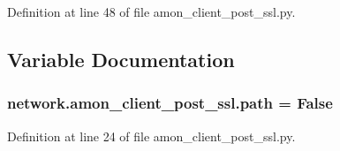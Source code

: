 Definition at line 48 of file amon\-\_\-client\-\_\-post\-\_\-ssl.\-py.



\subsection{Variable Documentation}
\hypertarget{namespacenetwork_1_1amon__client__post__ssl_a76288cc1048af423223bda2fbe4de79a}{
\subsubsection[{path}]{\setlength{\rightskip}{0pt plus 5cm}network.\-amon\-\_\-client\-\_\-post\-\_\-ssl.\-path = False}}\label{namespacenetwork_1_1amon__client__post__ssl_a76288cc1048af423223bda2fbe4de79a}


Definition at line 24 of file amon\-\_\-client\-\_\-post\-\_\-ssl.\-py.

